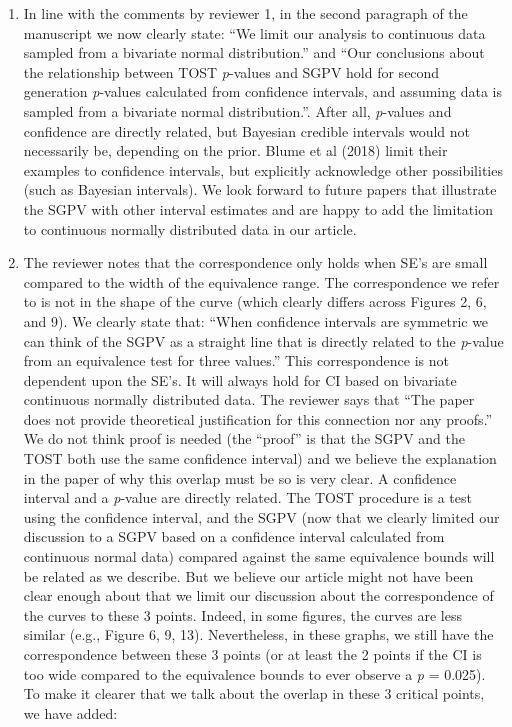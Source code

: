 \documentclass[man]{apa6}
\begin{document}
\begin{enumerate}
\def\labelenumi{\arabic{enumi}.}
\item
  In line with the comments by reviewer 1, in the second paragraph of
  the manuscript we now clearly state: \enquote{We limit our analysis to
  continuous data sampled from a bivariate normal distribution.} and
  \enquote{Our conclusions about the relationship between TOST
  \emph{p}-values and SGPV hold for second generation \emph{p}-values
  calculated from confidence intervals, and assuming data is sampled
  from a bivariate normal distribution.}. After all, \emph{p}-values and
  confidence are directly related, but Bayesian credible intervals would
  not necessarily be, depending on the prior. Blume et al (2018) limit
  their examples to confidence intervals, but explicitly acknowledge
  other possibilities (such as Bayesian intervals). We look forward to
  future papers that illustrate the SGPV with other interval estimates
  and are happy to add the limitation to continuous normally distributed
  data in our article.
\item
  The reviewer notes that the correspondence only holds when SE's are
  small compared to the width of the equivalence range. The
  correspondence we refer to is not in the shape of the curve (which
  clearly differs across Figures 2, 6, and 9). We clearly state that:
  \enquote{When confidence intervals are symmetric we can think of the
  SGPV as a straight line that is directly related to the \emph{p}-value
  from an equivalence test for three values.} This correspondence is not
  dependent upon the SE's. It will always hold for CI based on bivariate
  continuous normally distributed data. The reviewer says that
  \enquote{The paper does not provide theoretical justification for this
  connection nor any proofs.} We do not think proof is needed (the
  \enquote{proof} is that the SGPV and the TOST both use the same
  confidence interval) and we believe the explanation in the paper of
  why this overlap must be so is very clear. A confidence interval and a
  \emph{p}-value are directly related. The TOST procedure is a test
  using the confidence interval, and the SGPV (now that we clearly
  limited our discussion to a SGPV based on a confidence interval
  calculated from continuous normal data) compared against the same
  equivalence bounds will be related as we describe. But we believe our
  article might not have been clear enough about that we limit our
  discussion about the correspondence of the curves to these 3 points.
  Indeed, in some figures, the curves are less similar (e.g., Figure 6,
  9, 13). Nevertheless, in these graphs, we still have the
  correspondence between these 3 points (or at least the 2 points if the
  CI is too wide compared to the equivalence bounds to ever observe a
  \emph{p} = 0.025). To make it clearer that we talk about the overlap
  in these 3 critical points, we have added:
\end{enumerate}
\end{document}
